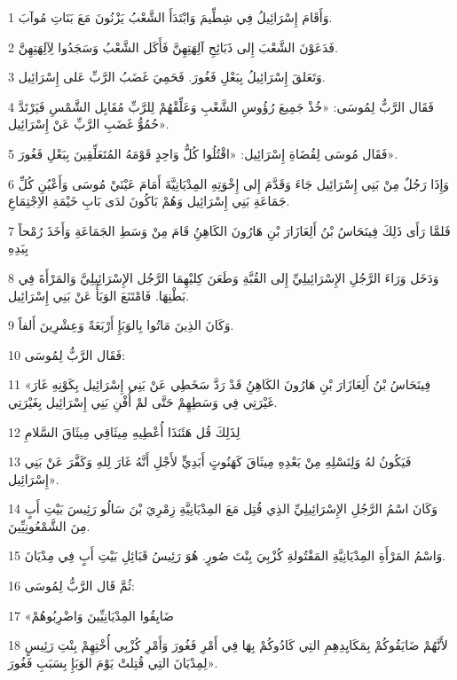 \par 1 وَأَقَامَ إِسْرَائِيلُ فِي شِطِّيمَ وَابْتَدَأَ الشَّعْبُ يَزْنُونَ مَعَ بَنَاتِ مُوآبَ.
\par 2 فَدَعَوْنَ الشَّعْبَ إِلى ذَبَائِحِ آلِهَتِهِنَّ فَأَكَل الشَّعْبُ وَسَجَدُوا لِآلِهَتِهِنَّ.
\par 3 وَتَعَلقَ إِسْرَائِيلُ بِبَعْلِ فَغُورَ. فَحَمِيَ غَضَبُ الرَّبِّ عَلى إِسْرَائِيل.
\par 4 فَقَال الرَّبُّ لِمُوسَى: «خُذْ جَمِيعَ رُؤُوسِ الشَّعْبِ وَعَلِّقْهُمْ لِلرَّبِّ مُقَابِل الشَّمْسِ فَيَرْتَدَّ حُمُوُّ غَضَبِ الرَّبِّ عَنْ إِسْرَائِيل».
\par 5 فَقَال مُوسَى لِقُضَاةِ إِسْرَائِيل: «اقْتُلُوا كُلُّ وَاحِدٍ قَوْمَهُ المُتَعَلِّقِينَ بِبَعْلِ فَغُورَ».
\par 6 وَإِذَا رَجُلٌ مِنْ بَنِي إِسْرَائِيل جَاءَ وَقَدَّمَ إِلى إِخْوَتِهِ المِدْيَانِيَّةَ أَمَامَ عَيْنَيْ مُوسَى وَأَعْيُنِ كُلِّ جَمَاعَةِ بَنِي إِسْرَائِيل وَهُمْ بَاكُونَ لدَى بَابِ خَيْمَةِ الاِجْتِمَاعِ.
\par 7 فَلمَّا رَأَى ذَلِكَ فِينَحَاسُ بْنُ أَلِعَازَارَ بْنِ هَارُونَ الكَاهِنُِ قَامَ مِنْ وَسَطِ الجَمَاعَةِ وَأَخَذَ رُمْحاً بِيَدِهِ
\par 8 وَدَخَل وَرَاءَ الرَّجُلِ الإِسْرَائِيلِيِّ إِلى القُبَّةِ وَطَعَنَ كِليْهِمَا الرَّجُل الإِسْرَائِيلِيَّ وَالمَرْأَةَ فِي بَطْنِهَا. فَامْتَنَعَ الوَبَأُ عَنْ بَنِي إِسْرَائِيل.
\par 9 وَكَانَ الذِينَ مَاتُوا بِالوَبَإِ أَرْبَعَةً وَعِشْرِينَ أَلفاً.
\par 10 فَقَال الرَّبُّ لِمُوسَى:
\par 11 «فِينَحَاسُ بْنُ أَلِعَازَارَ بْنِ هَارُونَ الكَاهِنُِ قَدْ رَدَّ سَخَطِي عَنْ بَنِي إِسْرَائِيل بِكَوْنِهِ غَارَ غَيْرَتِي فِي وَسَطِهِمْ حَتَّى لمْ أُفْنِ بَنِي إِسْرَائِيل بِغَيْرَتِي.
\par 12 لِذَلِكَ قُل هَئَنَذَا أُعْطِيهِ مِيثَاقِي مِيثَاقَ السَّلامِ
\par 13 فَيَكُونُ لهُ وَلِنَسْلِهِ مِنْ بَعْدِهِ مِيثَاقَ كَهَنُوتٍ أَبَدِيٍّ لأَجْلِ أَنَّهُ غَارَ لِلهِ وَكَفَّرَ عَنْ بَنِي إِسْرَائِيل».
\par 14 وَكَانَ اسْمُ الرَّجُلِ الإِسْرَائِيلِيِّ الذِي قُتِل مَعَ المِدْيَانِيَّةِ زِمْرِيَ بْنَ سَالُو رَئِيسَ بَيْتِ أَبٍ مِنَ الشَّمْعُونِيِّينَ.
\par 15 وَاسْمُ المَرْأَةِ المِدْيَانِيَّةِ المَقْتُولةِ كُزْبِيَ بِنْتَ صُورٍ. هُوَ رَئِيسُ قَبَائِلِ بَيْتِ أَبٍ فِي مِدْيَانَ.
\par 16 ثُمَّ قَال الرَّبُّ لِمُوسَى:
\par 17 «ضَايِقُوا المِدْيَانِيِّينَ وَاضْرِبُوهُمْ
\par 18 لأَنَّهُمْ ضَايَقُوكُمْ بِمَكَايِدِهِمِ التِي كَادُوكُمْ بِهَا فِي أَمْرِ فَغُورَ وَأَمْرِ كُزْبِي أُخْتِهِمْ بِنْتِ رَئِيسٍ لِمِدْيَانَ التِي قُتِلتْ يَوْمَ الوَبَإِ بِسَبَبِ فَغُورَ».

